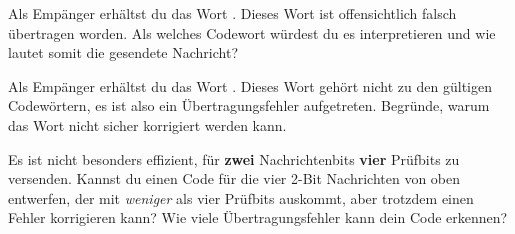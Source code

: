 \documentclass[10pt, a4paper]{scrartcl}
\begin{document}
\begin{aufgabe}
	Als Empänger erhältst du das Wort . Dieses Wort ist offensichtlich falsch übertragen worden. Als welches Codewort würdest du es interpretieren und wie lautet somit die gesendete Nachricht?
\end{aufgabe}

\begin{aufgabe}
	Als Empänger erhältst du das Wort . Dieses Wort gehört nicht zu den gültigen Codewörtern, es ist also ein Übertragungsfehler aufgetreten. Begründe, warum das Wort nicht sicher korrigiert werden kann.
\end{aufgabe}

\begin{aufgabe*}
	Es ist nicht besonders effizient, für \textbf{zwei} Nachrichtenbits \textbf{vier} Prüfbits zu versenden. Kannst du einen Code für die vier 2-Bit Nachrichten von oben  entwerfen, der mit \emph{weniger} als vier Prüfbits auskommt, aber trotzdem einen Fehler korrigieren kann? Wie viele Übertragungsfehler kann dein Code erkennen?
\end{aufgabe*}
\end{document}
